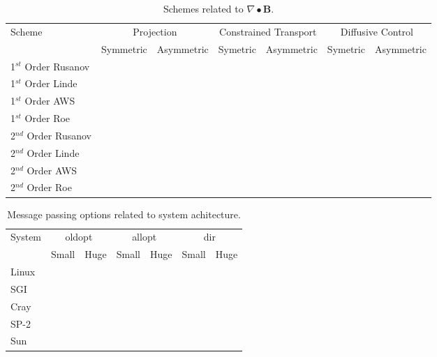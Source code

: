 \documentclass[10pt]{article}
\begin{document}
\begin{table}[!h]
\begin{tabular}{|l|c|c|c|c|c|c|} \hline
Scheme                   & \multicolumn{2}{c|}{Projection} & \multicolumn{2}{c|}{Constrained Transport} & \multicolumn{2}{c|}{Diffusive Control} \\ \cline{2-7}
                         &  Symmetric & Asymmetric & Symetric & Asymmetric & Symetric & Asymmetric  \\ \hline
1$^{st}$ Order Rusanov   &  &&     &    &&        \\ \hline
1$^{st}$ Order Linde     &  &&     &    &&        \\ \hline
1$^{st}$ Order AWS       &  &&     &    &&        \\ \hline
1$^{st}$ Order Roe       &  &&     &    &&        \\ \hline
2$^{nd}$ Order Rusanov   &  &&     &     &&      \\ \hline
2$^{nd}$ Order Linde     &  &&     &     &&      \\ \hline
2$^{nd}$ Order AWS       &  &&     &     &&      \\ \hline
2$^{nd}$ Order Roe       &  &&     &     &&      \\ \hline
\end{tabular}
\caption{Schemes related to $\nabla \bullet \mathbf{B}$.}
\end{table} 


\begin{table}[!h]
\begin{tabular}{|l|c|c|c|c|c|c|} \hline
System                   & \multicolumn{2}{c|}{oldopt} & \multicolumn{2}{c|}{allopt} & \multicolumn{2}{c|}{dir} \\ \cline{2-7}
                         &  Small & Huge & Small & Huge  & Small & Huge             \\ \hline
Linux           &  &&     &   &&        \\ \hline
SGI             &  &&     &   &&        \\ \hline
Cray           &  &&     &    &&       \\ \hline
SP-2           &  &&     &    &&       \\ \hline
Sun            &  &&     &    &&       \\ \hline
\end{tabular}
\caption{Message passing options related to system achitecture.}
\end{table} 
\end{document}
